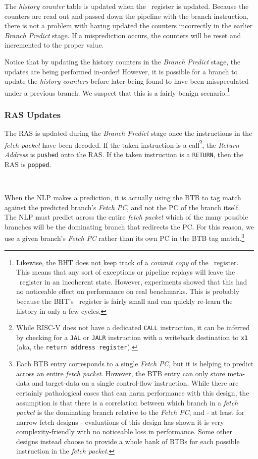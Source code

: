 The {\em history counter} table is updated when the \ghistory\ register is updated.  Because the counters are read out and passed down the pipeline with the branch instruction, there is not a problem with having updated the counters incorrectly in the earlier {\em Branch Predict} stage. If a misprediction occurs, the counters will be reset and incremented to the proper value.

Notice that by updating the history counters in the {\em Branch Predict} stage, the updates are being performed in-order!  However, it is possible for a branch to update the {\em history counters} before later being found to have been misspeculated under a previous branch. We suspect that this is a fairly benign scenario.\footnote{Likewise, the BHT does not keep track of a {\em commit copy} of the \ghistory\ register.  This means that any sort of exceptions or pipeline replays will leave the \ghistory\ register in an incoherent state.  However, experiments showed that this had no noticeable effect on performance on real benchmarks.  This is probably because the BHT's \ghistory\ register is fairly small and can quickly re-learn the history in only a few cycles.}


\subsubsection{RAS Updates}

The RAS is updated during the {\em Branch Predict} stage once the instructions in the {\em fetch packet} have been decoded. If the taken instruction is a call\footnote{While RISC-V does not have a dedicated {\tt {CALL}} instruction, it can be inferred by checking for a {\tt {JAL}} or {\tt {JALR}} instruction with a writeback destination to {\tt {x1}} (aka, the {\tt {return address register}}).}, the {\em Return Address} is {\tt {pushed}} onto the RAS. If the taken instruction is a {\tt {RETURN}}, then the RAS is {\tt {popped}}.

\



When the NLP makes a prediction, it is actually using the BTB to tag match against the predicted branch's {\em Fetch PC}, and not the PC of the branch itself.  
The NLP must predict across the entire {\em fetch packet} which of the many possible branches will be the dominating branch that redirects the PC.
For this reason, we use a given branch's {\em Fetch PC} rather than its own PC in the BTB tag match.\footnote{Each BTB entry corresponds to a single {\em Fetch PC}, but it is helping to predict across an entire {\em fetch packet}. However, the BTB entry can only store meta-data and target-data on a single control-flow instruction.  While there are certainly pathological cases that can harm performance with this design, the assumption is that there is a correlation between which branch in a {\em fetch packet} is the dominating branch relative to the {\em Fetch PC}, and - at least for narrow fetch designs - evaluations of this design has shown it is very complexity-friendly with no noticeable loss in performance. Some other designs instead choose to provide a whole bank of BTBs for each possible instruction in the {\em fetch packet}.} 

